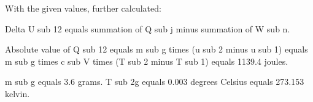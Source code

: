 With the given values, further calculated:  

Delta U sub 12 equals summation of Q sub j minus summation of W sub n.  

Absolute value of Q sub 12 equals m sub g times (u sub 2 minus u sub 1) equals m sub g times c sub V times (T sub 2 minus T sub 1) equals 1139.4 joules.  

m sub g equals 3.6 grams.  
T sub 2g equals 0.003 degrees Celsius equals 273.153 kelvin.